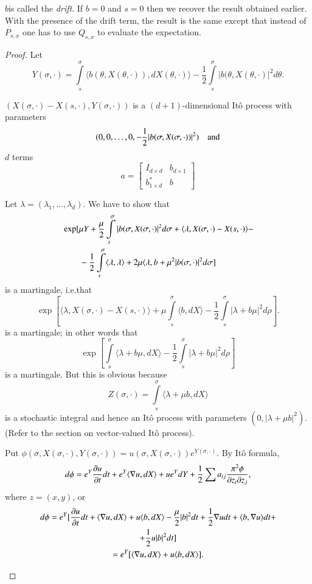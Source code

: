 \begin{remark*}
$b$\pageoriginale is called the {\em drift}. If $b=0$ and $s=0$ then
  we recover the result obtained earlier. With the presence of the
  drift term, the result is the same except that instead of $P_{s,x}$
  one has to use $Q_{s,x}$ to evaluate the expectation.
\end{remark*}

\begin{proof}
Let
$$
Y(\sigma,\cdot)=\int\limits^{\sigma}_{s}\langle
b(\theta,X(\theta,\cdot)), dX(\theta,\cdot)\rangle
-\frac{1}{2}\int\limits^{\sigma}_{s}|b(\theta,X(\theta,\cdot)|^{2}d\theta.
$$

\setcounter{step}{0}%
\begin{step}
$(X(\sigma,\cdot)-X(s,\cdot),Y(\sigma,\cdot))$ is a
  $(d+1)$-dimensional It\^o process with parameters
$$
(0,0,\ldots,0,-\frac{1}{2}|b(\sigma,X(\sigma,\cdot))|^{2})\quad\text{and}
$$
$d$ terms
$$
a=
\begin{bmatrix}
I_{d\times d} & b_{d\times 1}\\
b^{\ast}_{1\times d} & b
\end{bmatrix}
$$

Let $\lambda =(\lambda_{1},\ldots,\lambda_{d})$. We have to show that
\begin{align*}
& \exp [\mu
  Y+\frac{\mu}{2}\int\limits^{\sigma}_{s}|b(\sigma,X(\sigma,\cdot)|^{2}d\sigma+\langle
  \lambda,X(\sigma,\cdot)-X(s,\cdot)\rangle -\\
&\qquad -\frac{1}{2}\int\limits^{\sigma}_{s}\langle
  \lambda,\lambda\rangle +2\mu \langle\lambda,
  b+\mu^{2}|b(\sigma,\cdot)|^{2}d\sigma] 
\end{align*}
is a martingale, i.e.\@ that
$$
\exp[\langle \lambda,X(\sigma,\cdot)-X(s,\cdot)\rangle
  +\mu\int\limits^{\sigma}_{s}\langle b,dX\rangle
  -\frac{1}{2}\int\limits^{\sigma}_{s}|\lambda+b\mu|^{2}d\rho]. 
$$
is a martingale; in other words that
$$
\exp[\int\limits^{\sigma}_{s}\langle \lambda+b\mu, dX\rangle
  -\frac{1}{2}\int\limits^{\sigma}_{s}|\lambda+b\mu|^{2}d\rho]
$$\pageoriginale
is a martingale. But this is obvious because
$$
Z(\sigma,\cdot)=\int\limits^{\sigma}_{s}\langle \lambda +\mu
b,dX\rangle
$$
is a stochastic integral and hence an It\^o process with parameters
$(0,|\lambda +\mu b|^{2})$. (Refer to the section on vector-valued
It\^o process).
\end{step}

\begin{step}%
Put
$\phi(\sigma,X(\sigma,\cdot),Y(\sigma,\cdot))=u(\sigma,X(\sigma,\cdot))e^{Y(\sigma,\cdot)}$. By
It\^o formula,
$$
d\phi=e^{Y}\frac{\partial u}{\partial t}dt+e^{Y}\langle \nabla u, dX\rangle
+ue^{Y}dY+\frac{1}{2}\sum a_{ij}\frac{\pi^{2}\phi}{\partial z_{i}\partial z_{j}},
$$
where $z=(x,y)$, or
\begin{gather*}
d\phi=e^{Y}[\frac{\partial u}{\partial t}dt+\langle \nabla u, dX\rangle + u\langle
  b,dX\rangle -\frac{\mu}{2}|b|^{2}dt+\frac{1}{2}\nabla udt+\langle
  b,\nabla u\rangle dt+\\
+\frac{1}{2}u|b|^{2}dt]\\
=e^{Y}[\langle \nabla u, dX\rangle +u\langle b,dX\rangle].
\end{gather*}


\end{step}
\end{proof}
